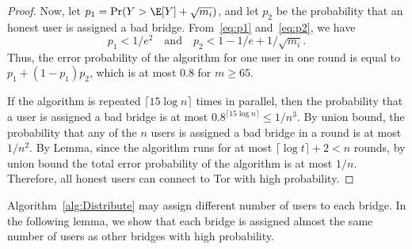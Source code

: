\begin{proof}
	Now, let ${p_1 = \Pr(Y > \E[Y] + \sqrt{m_i})}$, and let $p_2$ be the probability that an honest user is assigned a bad bridge. From~\eqref{eq:p1} and~\eqref{eq:p2}, we have
	\[p_1 < 1/e^2 \quad \text{and} \quad p_2 < 1-1/e + 1/\sqrt{m_i}.\]
	Thus, the error probability of the algorithm for one user in one round is equal to ${p_1 + (1-p_1)p_2}$, which is at most $0.8$ for ${m \geq 65}$.
	
	If the algorithm is repeated ${\lceil 15\log{n} \rceil}$ times in parallel, then the probability that a user is assigned a bad bridge is at most ${0.8^{\lceil 15\log{n} \rceil} \leq 1/n^3}$.
	By union bound, the probability that any of the $n$ users is assigned a bad bridge in a round is at most $1/n^2$. By Lemma, since the algorithm runs for at most ${\lceil\log{t}\rceil + 2 < n}$ rounds, by union bound the total error probability of the algorithm is at most $1/n$. Therefore, all honest users can connect to Tor with high probability.
\end{proof}


Algorithm~\ref{alg:Distribute} may assign different number of users to each bridge. In the following lemma, we show that each bridge is assigned almost the same number of users as other bridges with high probability.

